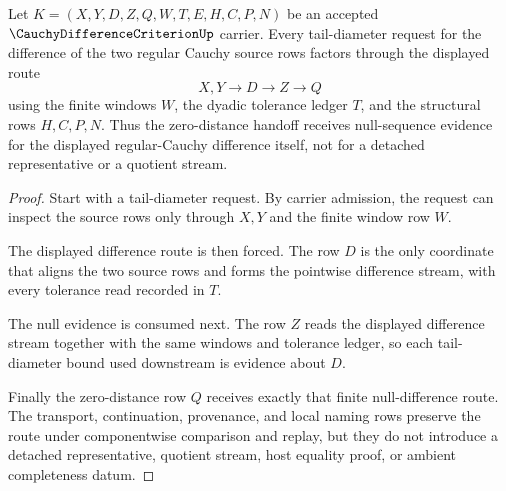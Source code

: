 \begin{theorem}
\label{thm:cauchy-difference-criterion-tail-diameter-handoff}
Let $K=(X,Y,D,Z,Q,W,T,E,H,C,P,N)$ be an accepted $\CauchyDifferenceCriterionUp$ carrier. Every tail-diameter request for the difference of the two regular Cauchy source rows factors through the displayed route
$$
X,Y \longrightarrow D \longrightarrow Z \longrightarrow Q
$$
using the finite windows $W$, the dyadic tolerance ledger $T$, and the structural rows $H,C,P,N$. Thus the zero-distance handoff receives null-sequence evidence for the displayed regular-Cauchy difference itself, not for a detached representative or a quotient stream.
\end{theorem}
\begin{proof}
Start with a tail-diameter request. By carrier admission, the request can inspect the source rows only through $X,Y$ and the finite window row $W$.

The displayed difference route is then forced. The row $D$ is the only coordinate that aligns the two source rows and forms the pointwise difference stream, with every tolerance read recorded in $T$.

The null evidence is consumed next. The row $Z$ reads the displayed difference stream together with the same windows and tolerance ledger, so each tail-diameter bound used downstream is evidence about $D$.

Finally the zero-distance row $Q$ receives exactly that finite null-difference route. The transport, continuation, provenance, and local naming rows preserve the route under componentwise comparison and replay, but they do not introduce a detached representative, quotient stream, host equality proof, or ambient completeness datum.
\end{proof}

